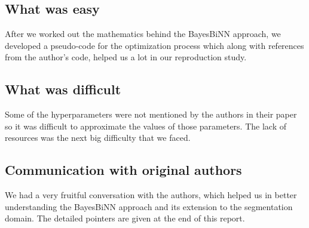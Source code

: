 \subsection*{What was easy}

After we worked out the mathematics behind the BayesBiNN approach, we developed a pseudo-code for the optimization process which along with references from the author's code, helped us a lot in our reproduction study. 

\subsection*{What was difficult}

Some of the hyperparameters were not mentioned by the authors in their paper so it was difficult to approximate the values of those parameters. The lack of resources was the next big difficulty that we faced.

\subsection*{Communication with original authors}

We had a very fruitful conversation with the authors, which helped us in better understanding the BayesBiNN approach and its extension to the segmentation domain. The detailed pointers are given at the end of this report.